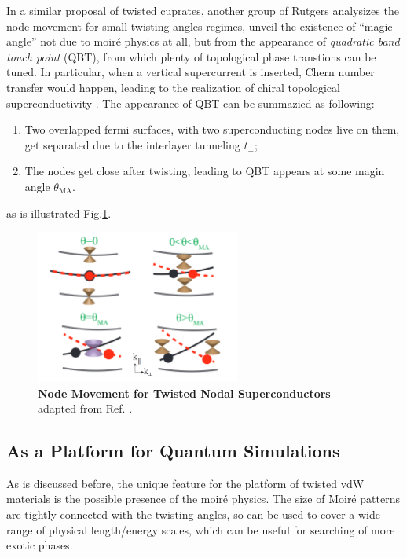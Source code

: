 In a similar proposal of twisted cuprates, another group of Rutgers analysizes the node movement for small twisting angles regimes, unveil the existence of ``magic angle'' not due to moir\'e physics at all, but from the appearance of \emph{quadratic band touch point} (QBT), from which plenty of topological phase transtions can be tuned. In particular, when a vertical supercurrent is inserted, Chern number transfer would happen, leading to the realization of chiral topological superconductivity \cite{volkov2023magic,volkov2023current}. The appearance of QBT can be summazied as following:
\begin{enumerate}
    \item Two overlapped fermi surfaces, with two superconducting nodes live on them, get separated due to the interlayer tunneling $t_\perp$;
    \item The nodes get close after twisting, leading to QBT appears at some magin angle $\theta_{\text{MA}}$.
\end{enumerate}
as is illustrated Fig.\ref{fig:twisted_nodal_SC}.
\begin{figure}[!htp]
    \centering
    \includegraphics[width=0.6\textwidth]{figures/Introduction/node_movement.png}
    \caption{\textbf{Node Movement for Twisted Nodal Superconductors} adapted from Ref. \cite{volkov2023magic}. }
    \label{fig:twisted_nodal_SC}
\end{figure}


\subsection{As a Platform for Quantum Simulations}
As is discussed before, the unique feature for the platform of twisted vdW materials is the possible presence of the moir\'e physics. The size of Moir\'e patterns are tightly connected with the twisting angles, so can be used to cover a wide range of physical length/energy scales, which can be useful for searching of more exotic phases.

